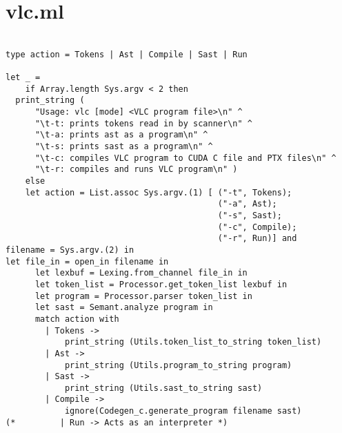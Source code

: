 \section{vlc.ml}
\begin{verbatim}

type action = Tokens | Ast | Compile | Sast | Run

let _ = 
	if Array.length Sys.argv < 2 then
  print_string (
      "Usage: vlc [mode] <VLC program file>\n" ^
      "\t-t: prints tokens read in by scanner\n" ^
      "\t-a: prints ast as a program\n" ^
      "\t-s: prints sast as a program\n" ^
      "\t-c: compiles VLC program to CUDA C file and PTX files\n" ^
      "\t-r: compiles and runs VLC program\n" )
	else
    let action = List.assoc Sys.argv.(1) [ ("-t", Tokens);
                                           ("-a", Ast);
                                           ("-s", Sast);
                                           ("-c", Compile);
                                           ("-r", Run)] and
filename = Sys.argv.(2) in
let file_in = open_in filename in
      let lexbuf = Lexing.from_channel file_in in
      let token_list = Processor.get_token_list lexbuf in
      let program = Processor.parser token_list in
      let sast = Semant.analyze program in
      match action with
        | Tokens ->
            print_string (Utils.token_list_to_string token_list)
        | Ast ->
            print_string (Utils.program_to_string program)
        | Sast -> 
            print_string (Utils.sast_to_string sast)
        | Compile ->
            ignore(Codegen_c.generate_program filename sast)
(*         | Run -> Acts as an interpreter *)
\end{verbatim}